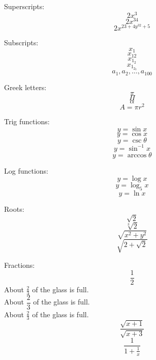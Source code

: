 \documentclass[12pt]{article}
\begin{document}
Superscripts:
$$2x^3$$
$$2x^{34}$$
$$2x^{23+4y^{32}+5}$$

Subscripts: $$x_1$$ $$x_{12}$$ $$x_{1_2}$$ $$x_{1_{2_3}}$$ $$a_1,a_2,\ldots,
    a_{100}$$

Greek letters: $$\pi$$ $$\Pi$$ $$\alpha$$ $$A=\pi r^2$$

Trig functions: $$y=\sin x$$ $$y=\cos x$$ $$y=\csc \theta$$ $$y=\sin^{-1} x$$
$$y=\arccos \theta$$

Log functions: $$y=\log x$$ $$y=\log_5 x$$ $$y=\ln x$$

Roots: $$\sqrt{2}$$ $$\sqrt[3]{2}$$ $$\sqrt{x^2+y^2}$$ $$\sqrt{2+\sqrt{2}}$$

Fractions: $$\frac{1}{2}$$ About $\displaystyle \frac{2}{3}$ of the glass is
full.\\[6pt]
About $\dfrac{2}{3}$ of the glass is full.\\[6pt]
About $\frac{2}{3}$ of the glass is full.
$$\frac{\sqrt{x+1}}{\sqrt{x+3}}$$
$$\frac{1}{1+\frac{1}{x}}$$
\end{document}
